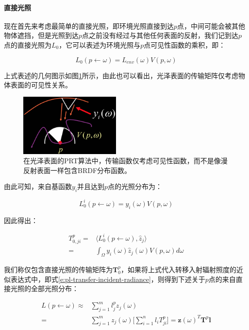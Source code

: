 \paragraph{直接光照}
现在首先来考虑最简单的直接光照，即环境光照直接到达$p$点，中间可能会被其他物体遮挡，但是光照到达$p$点之前没有经过与其他任何表面的反射，我们记到达$p$点的直接光照为$L_0$，它可以表述为环境光照与$p$点可见性函数的乘积，即：

\begin{equation}
	L_0(p\leftarrow\omega)=L_{env}(\omega)V(p,\omega)
\end{equation}

上式表述的几何图示如图\ref{f:pl-direct-light}所示，由此也可以看出，光泽表面的传输矩阵仅考虑物体表面的可见性关系。

\begin{figure}
	\sidecaption
	\includegraphics[width=0.45\textwidth]{figures/pl/direct-light}
	\caption{在光泽表面的PRT算法中，传输函数仅考虑可见性函数，而不是像漫反射表面一样包含BRDF分布函数。}
	\label{f:pl-direct-light}
\end{figure}

由此可知，来自基函数$y_i$并且达到$p$点的光照分布为：

\begin{equation}
	L^{i}_0(p\leftarrow\omega)=y_i(\omega)V(p,\omega)
\end{equation}

\noindent 因此得出：

\begin{equation}
\begin{aligned}
	T^{p}_{0,ji}=&\langle L^{i}_0(p\leftarrow\omega),\hat{z}_j\rangle \\
	=&\int_\Omega y_i(\omega)\hat{z}_j(\omega)V(p,\omega)d\omega
\end{aligned}
\end{equation}

我们称仅包含直接光照的传输矩阵为$\mathbf{T}^{p}_0$，如果将上式代入转移入射辐射照度的近似表达式中，即式\ref{e:pl-transfer-incident-radiance}，则得到下述关于$p$点的来自直接光照的全部光照分布：

\begin{equation}
\begin{aligned}
	L(p\leftarrow\omega)\approx &\sum^{m}_{j=1}l^{p}_{j}z_j(\omega)\\
	=&\sum^{m}_{j=1}z_j(\omega)\Biggr[ \sum^{n}_{i=1}l_iT^{p}_{ji}  \Biggr]
	=\mathbf{z}(\omega)^{T}\mathbf{T}^{p}\mathbf{l}
\end{aligned}
\end{equation} 

